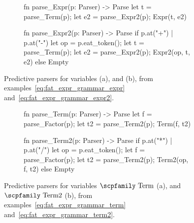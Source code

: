 \documentclass[
  oneside,
  english,
  coorientadorbanca,
  noabntexcite
]{ufsc-thesis-rn46-2019}
\newcommand{\codett}[1]{\text{\scpfamily#1}}
\newcommand{\bnfvar}[1]{\codett{#1}}
\begin{document}
\begin{figure}[ht]
  \centering
  \begin{subfigure}[b]{0.48\textwidth}
    \begin{minipage}{\textwidth}
      \begin{rustcode}
fn parse_Expr(p: Parser) -> Parse {
	let t = parse_Term(p);
	let e2 = parse_Expr2(p);
	Expr(t, e2)
}
			\end{rustcode}
    \end{minipage}
    \caption{}\label{fig:predictive_parser_expr}
  \end{subfigure}
  \quad
  \begin{subfigure}[b]{0.48\textwidth}
    \begin{minipage}{\textwidth}
      \begin{rustcode}
fn parse_Expr2(p: Parser) -> Parse {
  if p.at("+") | p.at("-") {
    let op = p.eat_token();
    let t = parse_Term(p);
    let e2 = parse_Expr2(p);
    Expr2(op, t, e2)
  } else {
    Empty
  }
}
      \end{rustcode}
    \end{minipage}
    \caption{}\label{fig:predictive_parser_expr2}
  \end{subfigure}
  \caption{
    Predictive parsers for variables \bnfvar{Expr} (a), and \bnfvar{Expr2} (b), from examples~\eqref{eq:fat_expr_grammar_expr} and~\eqref{eq:fat_expr_grammar_expr2}.
  }\label{fig:predictive_parser_expr_all}
\end{figure}

\begin{figure}[ht]
  \centering
  \begin{subfigure}[b]{0.48\textwidth}
    \begin{minipage}{\textwidth}
      \begin{rustcode}
fn parse_Term(p: Parser) -> Parse {
  let f = parse_Factor(p);
  let t2 = parse_Term2(p);
  Term(f, t2)
}
      \end{rustcode}
    \end{minipage}
    \caption{}\label{fig:predictive_parser_term}
  \end{subfigure}
  \quad
  \begin{subfigure}[b]{0.48\textwidth}
    \begin{minipage}{\textwidth}
      \begin{rustcode}
fn parse_Term2(p: Parser) -> Parse {
  if p.at("*") | p.at("/") {
    let op = p.eat_token();
    let f = parse_Factor(p);
    let t2 = parse_Term2(p);
    Term2(op, f, t2)
  } else {
    Empty
  }
}
      \end{rustcode}
    \end{minipage}
    \caption{}\label{fig:predictive_parser_term2}
  \end{subfigure}
  \caption{
    Predictive parsers for variables $\bnfvar{Term}$ (a), and $\bnfvar{Term2}$ (b), from examples~\eqref{eq:fat_expr_grammar_term} and~\eqref{eq:fat_expr_grammar_term2}.
  }\label{fig:predictive_parser_expr_term_all}
\end{figure}
\end{document}
